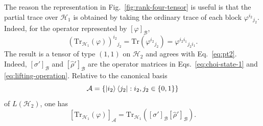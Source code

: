 \documentclass[
    aps,
    pra,
    reprint,
    superscriptaddress,
    nofootinbib
]{revtex4-2}
\theoremstyle{definition}
\theoremstyle{plain}
\begin{document}
The reason the representation in Fig.~\ref{fig:rank-four-tensor} is
useful is that the partial trace over $\mathcal{H}_{1}$ is obtained by
taking the ordinary trace of each block
$\varphi^{i_{2}}{}_{j_{2}}$. Indeed, for the operator represented by
$[\varphi]_{\mathcal{B}}$,
\begin{equation}
    \left(
        \mathrm{Tr}_{\mathcal{H}_{1}}(\varphi)
    \right)^{i_{2}}{}_{j_{2}}
    =
    \mathrm{Tr}\left(\varphi^{i_{2}}{}_{j_{2}}\right)
    =
    \varphi^{i_{2}i_{1}}{}_{j_{2}i_{1}}.
\end{equation}
The result is a tensor of type $(1,1)$ on $\mathcal{H}_{2}$ and agrees
with Eq.~\eqref{eq:pt2}. Indeed,
$[\sigma']_{\mathcal{B}}$ and $[\hat{\rho}']_{\mathcal{B}}$ are the
operator matrices in Eqs.~\eqref{eq:choi-state-1} and
\eqref{eq:lifting-operation}. Relative to the canonical basis
\begin{equation}
    \mathcal{A}
    =
    \left\{
        \ket{i_{2}}\bra{j_{2}}
        :
        i_{2},j_{2}\in\{0,1\}
    \right\}
\end{equation}
of $L(\mathcal{H}_{2})$, one has
\begin{equation}
    \left[
        \mathrm{Tr}_{\mathcal{H}_{1}}(\varphi)
    \right]_{\mathcal{A}}
    =
    \mathrm{Tr}_{\mathcal{H}_{1}}
    \left(
        [\sigma']_{\mathcal{B}}
        [\hat{\rho}']_{\mathcal{B}}
    \right).
\end{equation}
\end{document}
